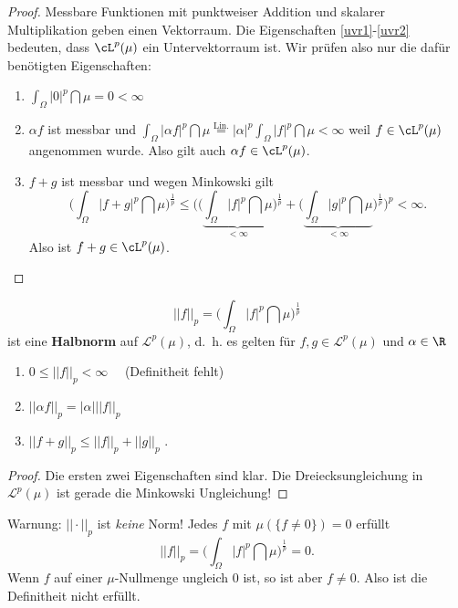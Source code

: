 \begin{proof}
	Messbare Funktionen mit punktweiser Addition und skalarer Multiplikation geben einen Vektorraum. Die Eigenschaften \ref{uvr1}-\ref{uvr2} bedeuten, dass $\cL^p(\mu)$ ein Untervektorraum ist. Wir prüfen also nur die dafür benötigten Eigenschaften:
	\begin{enumerate}[label=(\roman*)]
		\item $\int_{\Omega} |0|^p \dint \mu = 0<\infty$
		\item $\alpha f$ ist messbar und $\int_{\Omega} |\alpha f|^p \dint \mu \overset{\text{Lin.}}{=} |\alpha|^p \int_{\Omega} |f|^p \dint \mu < \infty$ weil $f \in \cL^p(\mu)$ angenommen wurde. Also gilt auch $\alpha f \in \cL^p(\mu)$.
		\item $f+g$ ist messbar und wegen Minkowski gilt
		\[ \Bigg(\int_{\Omega} |f+g|^p \dint \mu\Bigg)^{\frac{1}{p}} \leq \Bigg( \Bigg( \underbrace{\int_{\Omega} |f|^p \dint \mu}_{< \infty} \Bigg)^{\frac{1}{p}} + \Bigg( \underbrace{\int_{\Omega} |g|^p \dint \mu}_{< \infty} \Bigg)^{\frac{1}{p}} \Bigg)^p < \infty. \]
		Also ist $f+g \in \cL^p(\mu)$.
	\end{enumerate}
\end{proof}

\begin{lemma}
	\[ ||f||_p = \Big( \int_{\Omega} |f|^p \dint \mu \Big)^{\frac{1}{p}} \] ist eine \textbf{Halbnorm} auf $\mathcal L^p(\mu)$, \mbox{d. h.} es gelten f\"ur $f,g\in \mathcal L^p(\mu)$ und $\alpha\in \R$
	\begin{enumerate}[label=(\roman*)]
		\item $0 \leq ||f||_p < \infty\quad$ (Definitheit fehlt)
		\item $ ||\alpha f ||_p = | \alpha | ||f||_p$
		\item $|| f + g ||_p \leq ||f||_p + ||g||_p$ .
	\end{enumerate}
\end{lemma}

\begin{proof}
	Die ersten zwei Eigenschaften sind klar. Die Dreiecksungleichung in $\mathcal L^p(\mu)$ ist gerade die Minkowski Ungleichung!
\end{proof}

Warnung: $||\cdot ||_p$ ist \textit{keine} Norm! Jedes $f$ mit $\mu(\{f \neq 0\})=0$ erfüllt \[ || f ||_p = \Big( \int_{\Omega} |f|^p \dint \mu \Big)^{\frac{1}{p}} = 0. \] 
Wenn $f$ auf einer $\mu$-Nullmenge ungleich $0$ ist, so ist aber $f\neq 0$. Also ist die Definitheit nicht erf\"ullt.

